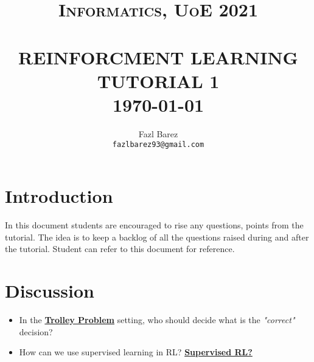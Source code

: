 \documentclass[paper=a4, fontsize=11pt,twoside]{scrartcl}	%
\title{	\normalsize \textsc{Informatics, UoE 2021} 	%
		 	\\[2.0cm]								%
			\HRule{0.5pt} \\						%
			\LARGE \textbf{\uppercase{Reinforcment Learning Tutorial 1}}	%
			\HRule{2pt} \\ [0.5cm]		%
			\normalsize \today			%
		}
\author{
		Fazl Barez\\	
        \texttt{fazlbarez93@gmail.com} \\
}
\makeatletter
\def\printtitle{%
    {\centering \@title\par}}
\def\printauthor{%
    {\centering \large \@author}}
\makeatother
\begin{document}
\thispagestyle{empty}		%

\printtitle					%
  	\vfill
\printauthor				%
\newpage
\setcounter{page}{1}		%
\section*{Introduction}

In this document students are encouraged to rise any questions, points from the tutorial. 
The idea is to keep a backlog of all the questions raised during and after the tutorial. Student can refer to this document for reference. 

\section*{Discussion}

\begin{itemize}
    \item {In the \href{https://en.wikipedia.org/wiki/Trolley_problem}{\textbf{Trolley Problem}} setting, who should decide what is the \textit{"correct"} decision?}
    \item {How can we use supervised learning in RL? \href{https://bair.berkeley.edu/blog/2020/10/13/supervised-rl/}{\textbf{Supervised RL?}}}
\end{itemize}
\end{document}
